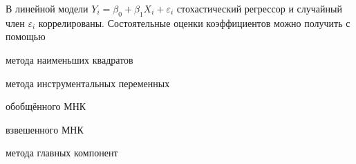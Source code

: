 
\begin{question}
В линейной модели \(Y_i = \beta_0 + \beta_1 X_i + \varepsilon_i\)
стохастический регрессор и случайный член \(\varepsilon_i\)
коррелированы. Состоятельные оценки коэффициентов можно получить с
помощью
\begin{answerlist}
  \item метода наименьших квадратов
  \item метода инструментальных переменных
  \item обобщённого МНК
  \item взвешенного МНК
  \item метода главных компонент
\end{answerlist}
\end{question}



